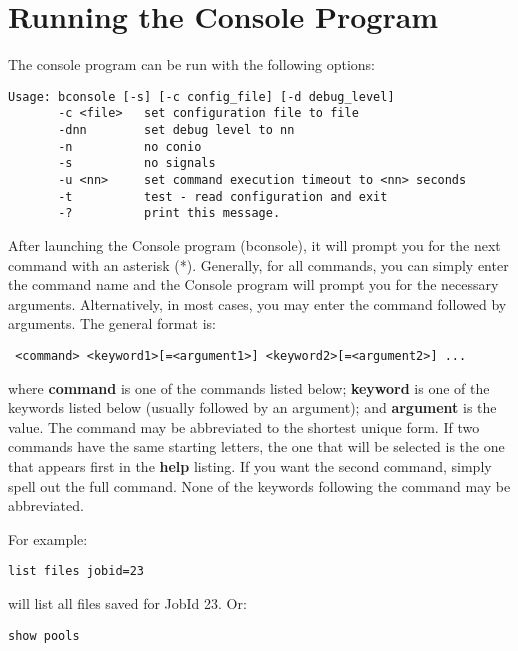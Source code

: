 \section{Running the Console Program}

The console program can be run with the following options:
\footnotesize
\begin{verbatim}
Usage: bconsole [-s] [-c config_file] [-d debug_level]
       -c <file>   set configuration file to file
       -dnn        set debug level to nn
       -n          no conio
       -s          no signals
       -u <nn>     set command execution timeout to <nn> seconds
       -t          test - read configuration and exit
       -?          print this message.
\end{verbatim}
\normalsize


After launching the Console program (bconsole), it will prompt you for the next
command with an asterisk (*).  Generally, for all commands, you can simply
enter the command name and the Console program will prompt you for the
necessary arguments. Alternatively, in most cases, you may enter the command
followed by arguments. The general format is:

\footnotesize
\begin{verbatim}
 <command> <keyword1>[=<argument1>] <keyword2>[=<argument2>] ...
\end{verbatim}
\normalsize

where {\bf command} is one of the commands listed below; {\bf keyword} is one
of the keywords listed below (usually followed by an argument); and {\bf
argument} is the value. The command may be abbreviated to the shortest unique
form. If two commands have the same starting letters, the one that will be
selected is the one that appears first in the {\bf help} listing. If you want
the second command, simply spell out the full command. None of the keywords
following the command may be abbreviated. 

For example: 

\footnotesize
\begin{verbatim}
list files jobid=23
\end{verbatim}
\normalsize

will list all files saved for JobId 23. Or: 

\footnotesize
\begin{verbatim}
show pools
\end{verbatim}
\normalsize


